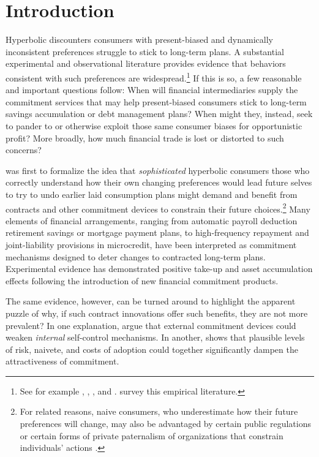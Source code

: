 \documentclass[11pt,english]{article}
\theoremstyle{plain}
\theoremstyle{definition}
\begin{document}
\section{Introduction}

Hyperbolic discounters \textendash{} consumers with present-biased and dynamically inconsistent preferences \textendash{} struggle to stick to long-term plans. A substantial experimental and observational literature provides evidence that behaviors consistent with such preferences are widespread.\footnote{See for example \citet{ariely2002}, \citet{thaler2004}, \citet{ashraf2006}, and \citet{bauer2012}. \citet{bryan2010}
survey this empirical literature.} If this is so, a few reasonable and important questions follow: When will financial intermediaries supply the commitment services that may help present-biased consumers stick to long-term savings accumulation or debt management plans? When might they, instead, seek to pander to or otherwise exploit those same consumer biases for opportunistic profit? More broadly, how much financial trade is lost or distorted to such concerns?

\citet{strotz1956} was first to formalize the idea that \emph{sophisticated} hyperbolic consumers \textendash{} those who correctly understand how their own changing preferences would lead future selves to try to undo earlier laid consumption plans \textendash{} might demand and benefit from contracts and other commitment devices to constrain
their future choices.\footnote{For related reasons, naive consumers, who underestimate how their future preferences will change, may also be advantaged by certain public regulations or certain forms of private paternalism of organizations that constrain individuals' actions \citep{spiegler2011}.} Many elements of financial arrangements, ranging from automatic payroll deduction retirement savings or mortgage payment plans, to high-frequency
repayment and joint-liability provisions in microcredit, have  been interpreted as commitment mechanisms designed to deter changes to contracted long-term plans. Experimental
evidence has demonstrated positive take-up and asset accumulation effects following the introduction of new financial commitment products.

The same evidence, however, can be turned around to highlight the apparent puzzle of why, if such contract innovations offer such benefits, they are not more prevalent? In one explanation, \citet{bernheim2015} argue that external commitment devices could weaken \emph{internal} self-control mechanisms. In another, \citet{laibson2015} shows that plausible levels of risk, naivete, and costs of adoption could together significantly dampen the attractiveness of commitment.
\end{document}
